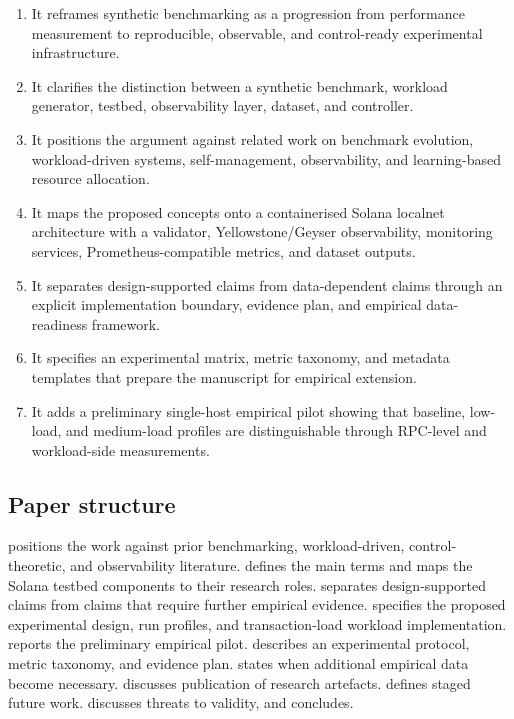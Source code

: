\documentclass[11pt,a4paper]{article}
\newcommand{\artifacts}{artefacts}
\begin{document}
\begin{enumerate}
  \item It reframes synthetic benchmarking as a progression from performance measurement to reproducible, observable, and control-ready experimental infrastructure.
  \item It clarifies the distinction between a synthetic benchmark, workload generator, testbed, observability layer, dataset, and controller.
  \item It positions the argument against related work on benchmark evolution, workload-driven systems, self-management, observability, and learning-based resource allocation.
  \item It maps the proposed concepts onto a containerised Solana localnet architecture with a validator, Yellowstone/Geyser observability, monitoring services, Prometheus-compatible metrics, and dataset outputs.
  \item It separates design-supported claims from data-dependent claims through an explicit implementation boundary, evidence plan, and empirical data-readiness framework.
  \item It specifies an experimental matrix, metric taxonomy, and metadata templates that prepare the manuscript for empirical extension.
  \item It adds a preliminary single-host empirical pilot showing that baseline, low-load, and medium-load profiles are distinguishable through RPC-level and workload-side measurements.
\end{enumerate}

\subsection{Paper structure}
\label{subsec:structure}

 positions the work against prior benchmarking, workload-driven, control-theoretic, and observability literature.  defines the main terms and maps the Solana testbed components to their research roles.  separates design-supported claims from claims that require further empirical evidence.  specifies the proposed experimental design, run profiles, and transaction-load workload implementation.  reports the preliminary empirical pilot.  describes an experimental protocol, metric taxonomy, and evidence plan.  states when additional empirical data become necessary.  discusses publication of research \artifacts.  defines staged future work.  discusses threats to validity, and  concludes.
\end{document}
